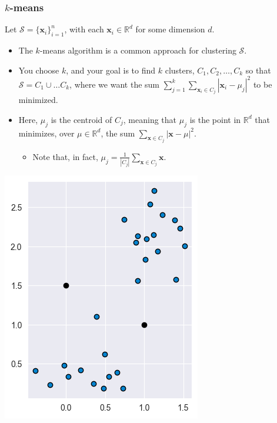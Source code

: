 \documentclass[smaller]{beamer}
\theoremstyle{example}
\newcommand{\x}{\textbf{x}}
\begin{document}
\begin{frame}
    \frametitle{$k$-means}
    Let $\mathcal S=\{\x_i\}_{i=1}^n$, with each $\x_i\in\mathbb R^d$ for some dimension $d$.

    \begin{itemize}
        \item The $k$-means algorithm is a common approach for clustering $\mathcal S$. 
        \item You choose $k$, and your goal is to find $k$ clusters, $C_1, C_2,\ldots, C_k$ so that $\mathcal S=C_1\cup\ldots C_k$, where we want the sum $\sum_{j=1}^k\sum_{\x_i\in C_j} |\x_i - \mu_{j}|^2$ to be minimized. 
        \item Here, $\mu_j$ is the centroid of $C_j$, meaning that $\mu_j$ is the point in $\mathbb R^d$ that minimizes, over $\mu\in\mathbb R^d$, the sum $\sum_{\x\in C_j}|\x - \mu|^2$.
        \begin{itemize}
            \item Note that, in fact, $\mu_j = \frac{1}{|C_j|}\sum_{\x \in C_j}\x$.
        \end{itemize}
    \end{itemize}

    \centering
    \includegraphics[height=0.35\textheight]{../../Images/kmeans_0.png}
\end{frame}
\end{document}
